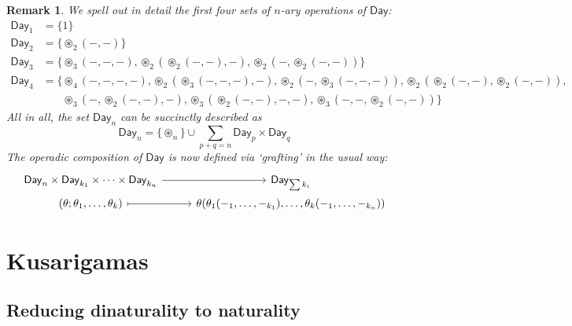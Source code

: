 \documentclass[11pt]{amsart}
\newcommand{\otimesDayN}[1]{\mathbin{\circledast}_{#1}}
\newtheorem{remark}{Remark}
\begin{document}
\begin{remark}%
	We spell out in detail the first four sets of $n$-ary operations of $\mathsf{Day}$:
	\begin{align*}
		\mathsf{Day}_{1} & = \{1\}                                                                                                                                                            \\
		\mathsf{Day}_{2} & = \{\otimesDayN{2}(-,-)\}                                                                                                                                            \\
		\mathsf{Day}_{3} & = \{\otimesDayN{3}(-,-,-),\otimesDayN{2}(\otimesDayN{2}(-,-),-),\otimesDayN{2}(-,\otimesDayN{2}(-,-))\}                                                              \\
		\mathsf{Day}_{4} & = \{\otimesDayN{4}(-,-,-,-),\otimesDayN{2}(\otimesDayN{3}(-,-,-),-),\otimesDayN{2}(-,\otimesDayN{3}(-,-,-)),\otimesDayN{2}(\otimesDayN{2}(-,-),\otimesDayN{2}(-,-)), \\\
		               & \phantom{=\{} \otimesDayN{3}(-,\otimesDayN{2}(-,-),-),\otimesDayN{3}(\otimesDayN{2}(-,-),-,-),\otimesDayN{3}(-,-,\otimesDayN{2}(-,-))\}
	\end{align*}
	All in all, the set $\mathsf{Day}_n$ can be succinctly described as
	\[\mathsf{Day}_n = \{\otimesDayN{n}\} \cup \sum_{p+q=n} \mathsf{Day}_p \times \mathsf{Day}_q \]
	The operadic composition of $\mathsf{Day}$ is now defined via `grafting' in the usual way:
	\[ 
		\begin{tikzcd}[row sep=0.0em, column sep=2.7em,  ampersand replacement=\&]
			\mathsf{Day}_{n}\times\mathsf{Day}_{k_{1}}\times\cdots\times\mathsf{Day}_{k_{n}}
			\arrow[r]
			\&
			\mathsf{Day}_{\sum k_i}
			\\
			{(\theta;\theta_{1},\ldots,\theta_{k})}
			\arrow[r, mapsto]
			\&
			{\theta(\theta_{1}(-_{1},\ldots,-_{k_{1}}),\ldots,\theta_{k}(-_{1},\ldots,-_{k_{n}}))}
		\end{tikzcd}
		\]
\end{remark}
\section{Kusarigamas}
\label{sec:orgade2373}
\subsection{Reducing dinaturality to naturality}
\label{sec:org2569e2e}
\end{document}
